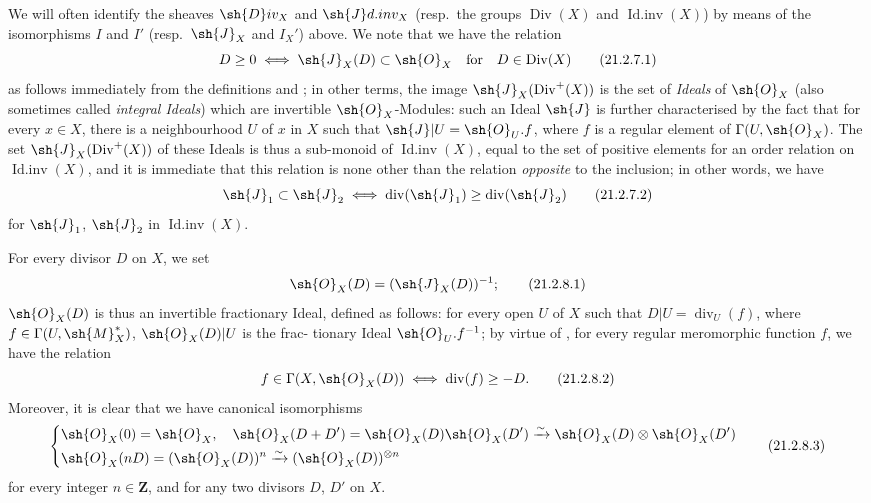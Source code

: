 \begin{env}[21.2.7]
\label{IV.21.2.7}
We will often identify the sheaves $\sh{D}iv_X$ and $\sh{J}d.inv_X$ (resp.\ the groups $\operatorname{Div}(X)$ and $\operatorname{Id.inv}(X)$) by means of the isomorphisms $I$ and $I'$ (resp.\ $\sh{J}_X$ and $I_X'$) above.
We note that we have the relation
\[
\label{IV.21.2.7.1}
  D\geq 0 \iff \sh{J}_X(D)\subset\sh{O}_X \quad\text{for}\quad D\in\operatorname{Div}(X)
  \tag{21.2.7.1}
\]
as follows immediately from the definitions  and ;
in other terms, the image $\sh{J}_X(\operatorname{Div}^+(X))$ is the set of \emph{Ideals} of $\sh{O}_X$ (also sometimes called \emph{integral Ideals}) which are invertible $\sh{O}_X$-Modules:
such an Ideal $\sh{J}$ is further characterised by the fact that for every $x\in X$, there is a neighbourhood $U$ of $x$ in $X$ such that $\sh{J}|U=\sh{O}_U.f$, where $f$ is a regular element of $\Gamma(U,\sh{O}_X)$.
The set $\sh{J}_X(\operatorname{Div}^+(X))$ of these Ideals is thus a sub-monoid of $\operatorname{Id.inv}(X)$, equal to the set of positive elements for an order relation on $\operatorname{Id.inv}(X)$, and it is immediate that this relation is none other than the relation \emph{opposite} to the inclusion;
in other words, we have
\[
\label{IV.21.2.7.2}
  \sh{J}_1\subset\sh{J}_2 \iff \operatorname{div}(\sh{J}_1)\geq\operatorname{div}(\sh{J}_2)
  \tag{21.2.7.2}
\]
for $\sh{J}_1$, $\sh{J}_2$ in $\operatorname{Id.inv}(X)$.
\end{env}

\begin{env}[21.2.8]
\label{IV.21.2.8}
For every divisor $D$ on $X$, we set
\[
\label{IV.21.2.8.1}
  \sh{O}_X(D)=(\sh{J}_X(D))^{-1};
  \tag{21.2.8.1}
\]
$\sh{O}_X(D)$ is thus an invertible fractionary Ideal, defined as follows:
for every open $U$ of $X$ such that $D|U=\operatorname{div}_U(f)$, where $f\in\Gamma(U,\sh{M}_X^*)$, $\sh{O}_X(D)|U$ is the frac-
tionary Ideal $\sh{O}_U.f^{-1}$;
by virtue of , for every regular meromorphic function $f$, we have the relation
\[
\label{IV.21.2.8.2}
  f\in\Gamma(X,\sh{O}_X(D)) \iff \operatorname{div}(f)\geq -D.
  \tag{21.2.8.2}
\]
Moreover, it is clear that we have canonical isomorphisms 
\[
\label{IV.21.2.8.3}
  \left\{\begin{aligned}
    &\sh{O}_X(0)=\sh{O}_X,\quad \sh{O}_X(D+D')=\sh{O}_X(D)\sh{O}_X(D')\xrightarrow{\sim}\sh{O}_X(D)\otimes\sh{O}_X(D')\\
    &\sh{O}_X(nD)=(\sh{O}_X(D))^n\xrightarrow{\sim}(\sh{O}_X(D))^{\otimes n}
  \end{aligned}\right.
  \tag{21.2.8.3}
\]
for every integer $n\in\mathbf{Z}$, and for any two divisors $D$, $D'$ on $X$.
\end{env}

